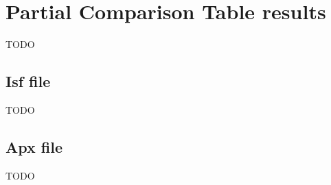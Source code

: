 \section{Partial Comparison Table results}\label{section:pct}

TODO

\subsection{Isf file}\label{sub:pct-isf}

TODO

\subsection{Apx file}\label{sub:pct-apx}

TODO

\vfill\newpage